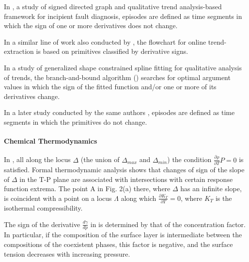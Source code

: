 \documentclass[11pt]{book}
\begin{document}
In \cite{maurya2007signed}, a study of signed directed graph
and qualitative trend analysis-based framework for incipient fault diagnosis, episodes are defined as time segments
in which the sign of one or more derivatives does not change.

In a similar line of work also conducted by \cite{maurya2010framework}, the flowchart for online trend-extraction is based on primitives classified by derivative signs.

In a study of generalized
shape constrained spline fitting for qualitative analysis of trends, the branch-and-bound algorithm (\cite{villez2013generalized}) searches
for optimal argument values in which the sign of the fitted function
and/or one or more of its derivatives change.

In a later study conducted by the same authors \cite{villez2014qualitative,thurlimannqualitative,villez2016shape,thurlimann2018soft},
episodes are defined as time segments in which the primitives do not
change.


\paragraph{Chemical Thermodynamics}

In \cite{poole2005density}, all along the locus $\Delta$ (the union
of $\Delta_{max}$ and $\Delta_{min}$) the condition $\frac{\partial\rho}{\partial T}P=0$
is satisfied. Formal thermodynamic analysis shows that changes of
sign of the slope of $\Delta$ in the T-P plane are associated with
intersections with certain response function extrema. The point A
in Fig. 2(a) there, where $\Delta$ has an infinite slope, is coincident
with a point on a locus $\Lambda$ along which $\frac{\partial K_{T}}{\partial T}=0$,
where $K_{T}$ is the isothermal compressibility.

The sign of the derivative $\frac{d\gamma}{dp}$ in \cite{baidakov2012surface}
is determined by that of the concentration factor. In particular,
if the composition of the surface layer is intermediate between the
compositions of the coexistent phases, this factor is negative, and
the surface tension decreases with increasing pressure.
\end{document}
